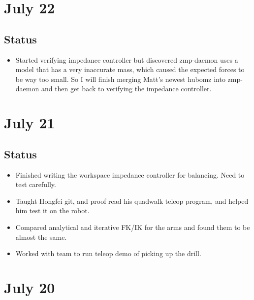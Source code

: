 \documentclass[letterpaper, 10 pt]{report}
\begin{document}
\section*{July 22}
\subsection*{Status}
\begin{itemize}
\item Started verifying impedance controller but discovered zmp-daemon uses a model that has a very inaccurate mass, which caused the expected forces to be way too small. So I will finish merging Matt's newest hubomz into zmp-daemon and then get back to verifying the impedance controller.
\end{itemize}

\section*{July 21}
\subsection*{Status}
\begin{itemize}
\item Finished writing the workspace impedance controller for balancing. Need to test carefully.
\item Taught Hongfei git, and proof read his quadwalk teleop program, and helped him test it on the robot.
\item Compared analytical and iterative FK/IK for the arms and found them to be almost the same.
\item Worked with team to run teleop demo of picking up the drill.
\end{itemize}

\section*{July 20}
\end{document}
